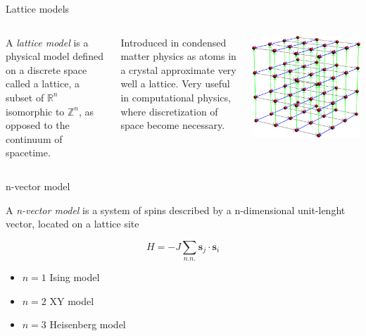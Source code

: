 \documentclass{beamer}
\begin{document}
\begin{frame}{Lattice models}

\begin{columns}

\begin{definition}
A \emph{lattice model} is a physical model defined on a discrete space called a 
lattice, a subset of $\mathbb{R}^n$ isomorphic to $\mathbb{Z}^n$, as opposed to 
the continuum of spacetime.
\end{definition}

\vspace{0.5cm}

Introduced in condensed matter physics as atoms in a crystal approximate very
well a lattice. Very useful in computational physics, where discretization of
space become necessary.

\includegraphics[scale=0.5]{3D_lattice.png}

\end{columns}

\end{frame}


\begin{frame}{n-vector model}

\begin{definition}
A \emph{n-vector model} is a system of spins described by a n-dimensional
unit-lenght vector, located on a lattice site
\end{definition}

\begin{equation}
\boxed{
H = - J \sum_{n.n.} \mathbf{s}_j \cdot \mathbf{s}_i}
\label{eq:ham}
\end{equation}

\begin{itemize}
\item $n=1$ Ising model
\item $n=2$ XY model
\item $n=3$ Heisenberg model
\end{itemize}

\end{frame}
\end{document}
